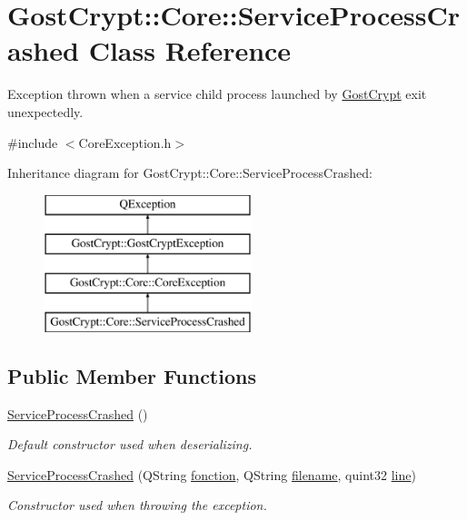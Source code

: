 \hypertarget{class_gost_crypt_1_1_core_1_1_service_process_crashed}{}\section{Gost\+Crypt\+:\+:Core\+:\+:Service\+Process\+Crashed Class Reference}
\label{class_gost_crypt_1_1_core_1_1_service_process_crashed}


Exception thrown when a service child process launched by \hyperlink{namespace_gost_crypt}{Gost\+Crypt} exit unexpectedly.  




{\ttfamily \#include $<$Core\+Exception.\+h$>$}

Inheritance diagram for Gost\+Crypt\+:\+:Core\+:\+:Service\+Process\+Crashed\+:\begin{figure}[H]
\begin{center}
\leavevmode
\includegraphics[height=4.000000cm]{class_gost_crypt_1_1_core_1_1_service_process_crashed}
\end{center}
\end{figure}
\subsection*{Public Member Functions}
\begin{DoxyCompactItemize}
\item 
\hyperlink{class_gost_crypt_1_1_core_1_1_service_process_crashed_af3d3538f834894437368aa287cc46cc9}{Service\+Process\+Crashed} ()
\begin{DoxyCompactList}\small\item\em Default constructor used when deserializing. \end{DoxyCompactList}\item 
\hyperlink{class_gost_crypt_1_1_core_1_1_service_process_crashed_a5b00aad6cef3e33b2f17bbed11a0048c}{Service\+Process\+Crashed} (Q\+String \hyperlink{class_gost_crypt_1_1_gost_crypt_exception_a29b8c93d5efbb1ff369107385725a939}{fonction}, Q\+String \hyperlink{class_gost_crypt_1_1_gost_crypt_exception_a749a12375f4ba9d502623b99d8252f38}{filename}, quint32 \hyperlink{class_gost_crypt_1_1_gost_crypt_exception_abf506d911f12a4e969eea500f90bd32c}{line})
\begin{DoxyCompactList}\small\item\em Constructor used when throwing the exception. \end{DoxyCompactList}\end{DoxyCompactItemize}
